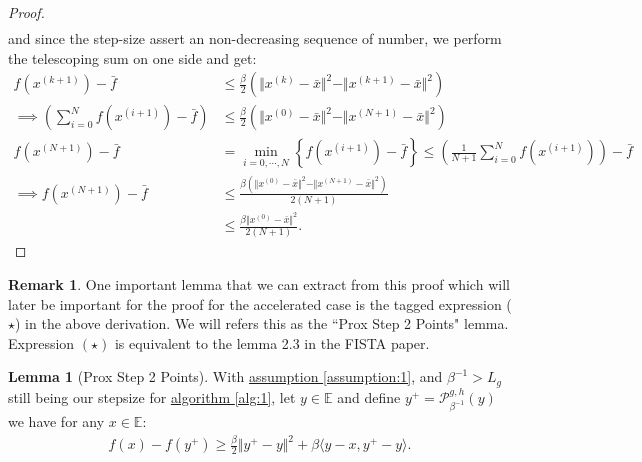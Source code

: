 \documentclass[]{article}
\theoremstyle{definition}
\newtheorem{lemma}{Lemma}[subsection]  %
\newtheorem{remark}{Remark}[subsection]
{
    \newtheorem{assumption}{Assumption}
}
\begin{document}
\begin{proof}
\begin{align*}
            \end{align*}
            and since the step-size assert an non-decreasing sequence of number, we perform the telescoping sum on one side and get: 
            \begin{align*}
                f(x^{(k + 1)}) - \bar f 
                &\le
                \frac{\beta}{2}(\Vert x^{(k)} - \bar x\Vert^2 - \Vert x^{(k + 1)} - \bar x\Vert^2)
                \\
                \implies
                \left(
                    \sum_{i = 0}^{N} f(x^{(i + 1)})
                    - \bar f
                \right)
                &\le
                \frac{\beta}{2}
                (\Vert x^{(0)} - \bar x\Vert^2 - \Vert x^{(N + 1)} - \bar x\Vert^2)
                \\
                f(x^{(N + 1)}) - \bar f & = 
                \min_{i = 0, \cdots, N}\left\lbrace
                    f(x^{(i + 1)}) - \bar f
                \right\rbrace \le 
                \left(
                    \frac{1}{N + 1}\sum_{i = 0}^{N}f(x^{(i + 1)})
                \right) - \bar f
                \\
                \implies
                f(x^{(N + 1)}) - \bar f
                &\le  
                \frac{\beta(\Vert x^{(0)} - \bar x\Vert^2 - \Vert x^{(N + 1)} - \bar x\Vert^2)}{2(N + 1)}
                \\
                &\le 
                \frac{\beta \Vert x^{(0)} - \bar x\Vert^2 }{2(N + 1)}. 
            \end{align*}
        \end{proof}
        \begin{remark}
            One important lemma that we can extract from this proof which will later be important for the proof for the accelerated case is the tagged expression ($\star$) in the above derivation. We will refers this as the ``Prox Step 2 Points" lemma. Expression $(\star)$ is equivalent to the lemma 2.3 in the FISTA paper\cite{paper:FISTA}. 
        \end{remark}
        \begin{lemma}[Prox Step 2 Points]\label{lemma:prox_two_p}
            With \hyperref[assumption:1]{assumption \ref*{assumption:1}}, and $\beta^{-1} > L_g$ still being our stepsize for \hyperref[alg:1]{algorithm \ref*{alg:1}}, let $y\in \mathbb E$ and define $y^+ = \mathcal P_{\beta^{-1}}^{g, h}(y)$ we have for any $x\in \mathbb E$: 
            \begin{align*}
                f(x) - f(y^+) \ge \frac{\beta}{2}\Vert y^+ - y\Vert^2 + 
                \beta \langle y - x, y^+ - y\rangle. 
            \end{align*}
        \end{lemma}
\end{document}
